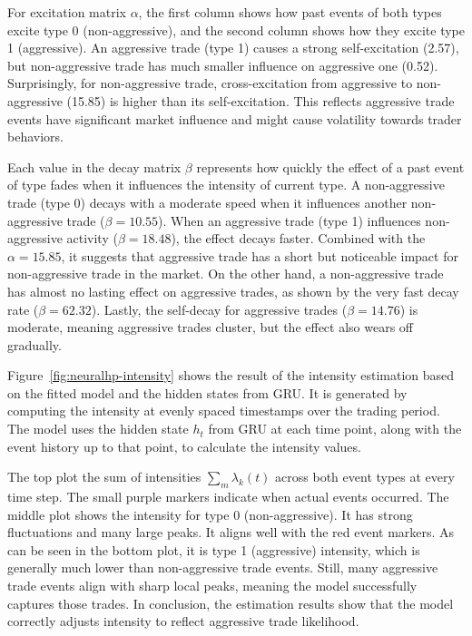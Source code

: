 For excitation matrix $\alpha$, the first column shows how past events of both types excite type 0 (non-aggressive), and the second column shows how they excite type 1 (aggressive). An aggressive trade (type 1) causes a strong self-excitation (2.57), but non-aggressive trade has much smaller influence on aggressive one (0.52). Surprisingly, for non-aggressive trade, cross-excitation from aggressive to non-aggressive (15.85) is higher than its self-excitation. This reflects aggressive trade events have significant market influence and might cause volatility towards trader behaviors. 

Each value in the decay matrix $\beta$ represents how quickly the effect of a past event of type fades when it influences the intensity of current type. A non-aggressive trade (type 0) decays with a moderate speed when it influences another non-aggressive trade (\( \beta = 10.55 \)). When an aggressive trade (type 1) influences non-aggressive activity (\( \beta = 18.48 \)), the effect decays faster. Combined with the $\alpha = 15.85$, it suggests that aggressive trade has a short but noticeable impact for non-aggressive trade in the market. On the other hand, a non-aggressive trade has almost no lasting effect on aggressive trades, as shown by the very fast decay rate (\( \beta = 62.32 \)). Lastly, the self-decay for aggressive trades (\( \beta = 14.76 \)) is moderate, meaning aggressive trades cluster, but the effect also wears off gradually.

Figure~\ref{fig:neuralhp-intensity} shows the result of the intensity estimation based on the fitted model and the hidden states from GRU. It is generated by computing the intensity at evenly spaced timestamps over the trading period. The model uses the hidden state $h_t$ from GRU at each time point, along with the event history up to that point, to calculate the intensity values. 

The top plot the sum of intensities $\sum_{m} \lambda_k(t)$ across both event types at every time step. The small purple markers indicate when actual events occurred. The middle plot shows the intensity for type 0 (non-aggressive). It has strong fluctuations and many large peaks. It aligns well with the red event markers. As can be seen in the bottom plot, it is type 1 (aggressive) intensity, which is generally much lower than non-aggressive trade events. Still, many aggressive trade events align with sharp local peaks, meaning the model successfully captures those trades. In conclusion, the estimation results show that the model correctly adjusts intensity to reflect aggressive trade likelihood.

